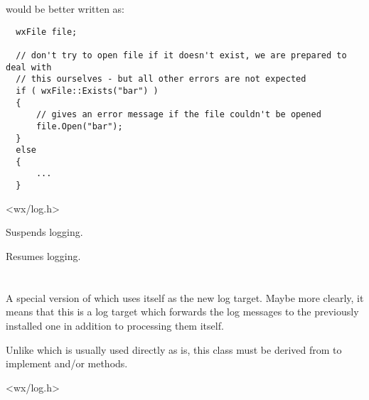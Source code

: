 would be better written as:

{\small
\begin{verbatim}
  wxFile file;

  // don't try to open file if it doesn't exist, we are prepared to deal with
  // this ourselves - but all other errors are not expected
  if ( wxFile::Exists("bar") )
  {
      // gives an error message if the file couldn't be opened
      file.Open("bar");
  }
  else
  {
      ...
  }
\end{verbatim}
}%




<wx/log.h>




Suspends logging.


Resumes logging.


\section{}\label{wxlogpassthrough}

A special version of  which uses itself as the
new log target. Maybe more clearly, it means that this is a log target which
forwards the log messages to the previously installed one in addition to
processing them itself.

Unlike  which is usually used directly as is,
this class must be derived from to implement 
and/or  methods.




<wx/log.h>


\label{wxlogpassthroughctor}

